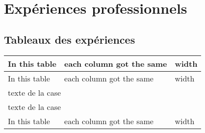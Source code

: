\chapter{Expériences professionnels}

\section{Tableaux des expériences}

\begin{tabularx}{15cm}{|X|X|X|}
\hline \rowcolor{lightgray}
In this table & each column got the same & width\\
\hline
In this table & each column got the same & width\\
\hline
\multicolumn{3}{|l|}{texte de la case} \\
\hline
\multicolumn{3}{|l|}{texte de la case} \\
\hline
In this table & each column got the same & width\\
\hline
\end{tabularx}
